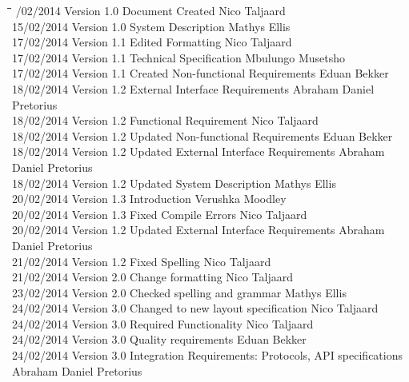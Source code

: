 \documentclass[12pt]{article}
\begin{document}
		\begin{tabbing}
			\hspace*{2.5cm}\=\hspace*{2.5cm}\=\hspace*{8cm}\=\hspace*{3cm} /02/2014 \> Version 1.0 \> Document Created \> Nico Taljaard \\
			15/02/2014 \> Version 1.0 \> System Description \> Mathys Ellis \\
			17/02/2014 \> Version 1.1 \> Edited Formatting \> Nico Taljaard \\
			17/02/2014 \> Version 1.1 \> Technical Specification \> Mbulungo Musetsho \\
			17/02/2014 \> Version 1.1 \> Created Non-functional Requirements \> Eduan Bekker \\
			18/02/2014 \> Version 1.2 \> External Interface Requirements \> Abraham Daniel Pretorius  \\
			18/02/2014 \> Version 1.2 \> Functional Requirement \> Nico Taljaard \\
			18/02/2014 \> Version 1.2 \> Updated Non-functional Requirements \> Eduan Bekker \\
			18/02/2014 \> Version 1.2 \> Updated External Interface Requirements \> Abraham Daniel Pretorius  \\
			18/02/2014 \> Version 1.2 \> Updated System Description \> Mathys Ellis \\
			20/02/2014 \> Version 1.3 \> Introduction \> Verushka Moodley \\
			20/02/2014 \> Version 1.3 \> Fixed Compile Errors \> Nico Taljaard \\
			20/02/2014 \> Version 1.2 \> Updated External Interface Requirements \> Abraham Daniel Pretorius  \\
			21/02/2014 \> Version 1.2 \> Fixed Spelling \> Nico Taljaard \\
			21/02/2014 \> Version 2.0 \> Change formatting \> Nico Taljaard \\
			23/02/2014 \> Version 2.0 \> Checked spelling and grammar \> Mathys Ellis \\
			24/02/2014 \> Version 3.0 \> Changed to new layout specification \> Nico Taljaard \\
			24/02/2014 \> Version 3.0 \> Required Functionality \> Nico Taljaard \\	
			24/02/2014 \> Version 3.0 \> Quality requirements \> Eduan Bekker \\
			24/02/2014 \> Version 3.0 \> Integration Requirements: Protocols, API specifications  \> Abraham Daniel Pretorius \\	
		\end{tabbing}
\end{document}
